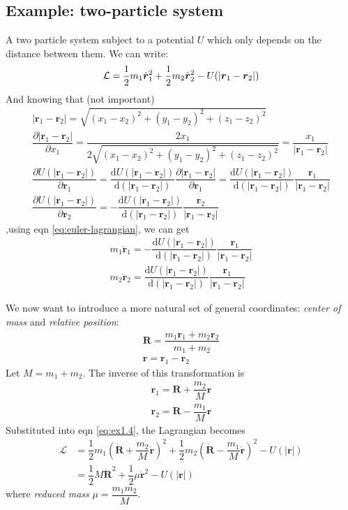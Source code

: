 \documentclass[
  10pt,
  twoside,
  openany,
  b5paper, %
  colorscheme = bootstrap-v4, %
]{qyxf-book}
\newcommand{\der}[2]{\dfrac{\md #1}{\md #2}}
\newcommand{\p}[2]{\dfrac{\partial #1}{\partial #2}}
\newcommand{\md}{\mathrm{d}}
\newcommand{\vr}{\boldsymbol{r}}
\newcommand{\dvr}{\dot{\vr}}
\newcommand{\ddvr}{\ddot{\vr}}
\newcommand{\half}{\dfrac{1}{2}}
\newcommand{\lag}{\mathcal{L}} %
\begin{document}
\subsection{Example: two-particle system}
A two particle system subject to a potential $U$ which only depends on the distance between them. We can write:
\begin{equation}
	\lag=\half m_1\dvr_1^2+\half m_2\dvr_2^2-U(|\vr_1-\vr_2|) \label{eq:ex1.4}\\
\end{equation}
And knowing that (not important)
\begin{gather*}
	|\vr_1-\vr_2|=\sqrt{(x_1-x_2)^2+(y_1-y_2)^2+(z_1-z_2)^2}\\
	\p{|\vr_1-\vr_2|}{x_1}=\dfrac{2x_1}{2\sqrt{(x_1-x_2)^2+(y_1-y_2)^2+(z_1-z_2)^2}}=\dfrac{x_1}{|\vr_1-\vr_2|}\\
	\p{U(|\vr_1-\vr_2|)}{\vr_1}=\der{U(|\vr_1-\vr_2|)}{(|\vr_1-\vr_2|)}\p{|\vr_1-\vr_2|}{\vr_1}=\der{U(|\vr_1-\vr_2|)}{(|\vr_1-\vr_2|)}\dfrac{\vr_1}{|\vr_1-\vr_2|}\\
	\p{U(|\vr_1-\vr_2|)}{\vr_2}=-\der{U(|\vr_1-\vr_2|)}{(|\vr_1-\vr_2|)}\dfrac{\vr_2}{|\vr_1-\vr_2|}
\end{gather*}
,using eqn \ref{eq:euler-lagrangian}, we can get
\begin{gather*}
	m_1\ddvr_1=-\der{U(|\vr_1-\vr_2|)}{(|\vr_1-\vr_2|)}\dfrac{\vr_1}{|\vr_1-\vr_2|}\\
	m_2\ddvr_2=\der{U(|\vr_1-\vr_2|)}{(|\vr_1-\vr_2|)}\dfrac{\vr_1}{|\vr_1-\vr_2|}
\end{gather*}

We now want to introduce a more natural set of general coordinates: \textit{center of mass} and \textit{relative position}:
\begin{gather*}
	\boldsymbol{R}=\dfrac{m_1\vr_1+m_2\vr_2}{m_1+m_2}\\
	\vr=\vr_1-\vr_2
\end{gather*}
Let $M=m_1+m_2$. The inverse of this transformation is
\begin{gather*}
	\vr_1=\boldsymbol{R}+\dfrac{m_2}{M}\vr\\
	\vr_2=\boldsymbol{R}-\dfrac{m_1}{M}\vr
\end{gather*}
Substituted into eqn \ref{eq:ex1.4}, the Lagrangian becomes
\begin{align*}
	\lag&=
	\half 
	m_1\left(\dot{\boldsymbol{R}}+\dfrac{m_2}{M}\dvr\right)^2+
	\half m_2\left(\dot{\boldsymbol{R}}-\dfrac{m_1}{M}\dvr\right)^2-U(|\vr|)\\
	&=\half M\dot{\boldsymbol{R}}^2+\half\mu\dvr^2-U(|\vr|)
\end{align*}
where \textit{reduced mass} $\mu=\dfrac{m_1m_2}{M}$.
\end{document}

